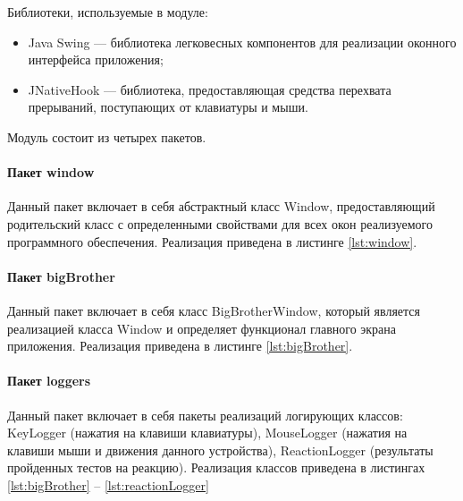 Библиотеки, используемые в модуле:

\begin{itemize}[leftmargin=1.6\parindent]
\item Java Swing \cite{swing} --- библиотека легковесных компонентов для реализации оконного интерфейса приложения;
\item JNativeHook \cite{jnativehook} --- библиотека, предоставляющая средства перехвата прерываний, поступающих от клавиатуры и мыши.
\end{itemize}

Модуль состоит из четырех пакетов.

\paragraph{Пакет window \newline}
Данный пакет включает в себя абстрактный класс Window, предоставляющий родительский класс с определенными свойствами для всех окон реализуемого программного обеспечения. Реализация приведена в листинге \ref{lst:window}.



\paragraph{Пакет bigBrother \newline}
Данный пакет включает в себя класс BigBrotherWindow, который является реализацией класса Window и определяет функционал главного экрана приложения. Реализация приведена в листинге \ref{lst:bigBrother}.



\paragraph{Пакет loggers \newline}
Данный пакет включает в себя пакеты реализаций логирующих классов: KeyLogger (нажатия на клавиши клавиатуры), MouseLogger (нажатия на клавиши мыши и движения данного устройства), ReactionLogger (результаты пройденных тестов на реакцию). Реализация классов приведена в листингах \ref{lst:bigBrother} -- \ref{lst:reactionLogger}

